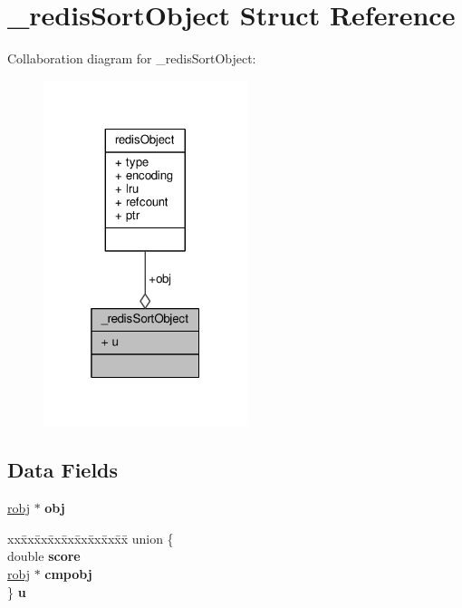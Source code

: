 \hypertarget{struct__redisSortObject}{}\section{\+\_\+redis\+Sort\+Object Struct Reference}
\label{struct__redisSortObject}


Collaboration diagram for \+\_\+redis\+Sort\+Object\+:\nopagebreak
\begin{figure}[H]
\begin{center}
\leavevmode
\includegraphics[width=169pt]{struct__redisSortObject__coll__graph}
\end{center}
\end{figure}
\subsection*{Data Fields}
\begin{DoxyCompactItemize}
\item 
\mbox{\label{struct__redisSortObject_a4537823adb41ac7cc390fc3e6ef20969}} 
\hyperlink{structredisObject}{robj} $\ast$ {\bfseries obj}
\item 
\mbox{\label{struct__redisSortObject_ac8b897d5e08a1b3a0257d4ebec6f3146}} 
\begin{tabbing}
xx\=xx\=xx\=xx\=xx\=xx\=xx\=xx\=xx\=\kill
union \{\\
\mbox{\label{struct__redisSortObject_a8b20a0ac67a22f100cb44039985048e3}} 
double {\bfseries score}\\
\mbox{\label{struct__redisSortObject_ae0dfac5206eb3a811ca122f2acd5ab0d}} 
\hyperlink{structredisObject}{robj} $\ast$ {\bfseries cmpobj}\\
\} {\bfseries u}\\

\end{tabbing}\end{DoxyCompactItemize}



